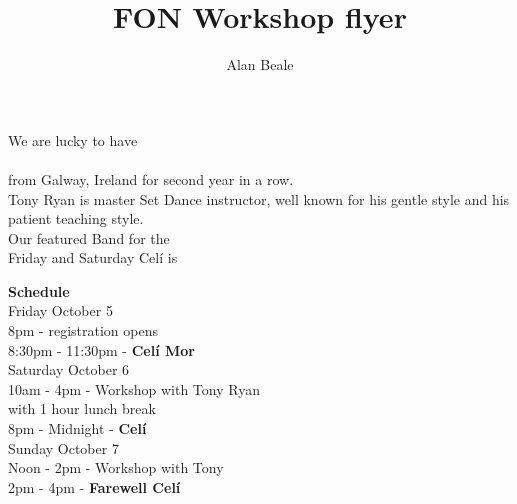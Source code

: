 \documentclass[12pt,
letterpaper]{leaflet}
\title{FON Workshop flyer}
\author{Alan Beale}
\date{}
\begin{document}

\pagebreak
\begin{center}
We are lucky to have \\
\\
\vspace*{1em} from Galway, Ireland for second year in a row.\\
Tony Ryan is master Set Dance instructor, well known for his gentle
style and his patient teaching style. \\

\vspace*{4em}
Our featured Band for the \\Friday and Saturday Cel\'{i} is \\
\end{center}
\pagebreak

\begin{flushleft}
{\large \textbf{Schedule}}\\ 
\vspace*{2em}
Friday October 5\\
\hspace*{6em}  8pm  - registration opens\\
\hspace*{6em}  8:30pm  - 11:30pm  - \textbf{Cel\'{i} Mor}\\

Saturday October 6\\
\hspace*{6em}  10am - 4pm  - Workshop with Tony Ryan\\
\hspace*{6em}  {\small with 1 hour lunch break}\\

\hspace*{6em}  8pm - Midnight - \textbf{Cel\'{i}}\\

Sunday October 7\\
\hspace*{6em}  Noon - 2pm  - Workshop  with Tony \\

 \hspace*{6em} 2pm - 4pm - \textbf{Farewell Cel\'{i}}\\
\end{flushleft}
\end{document}
